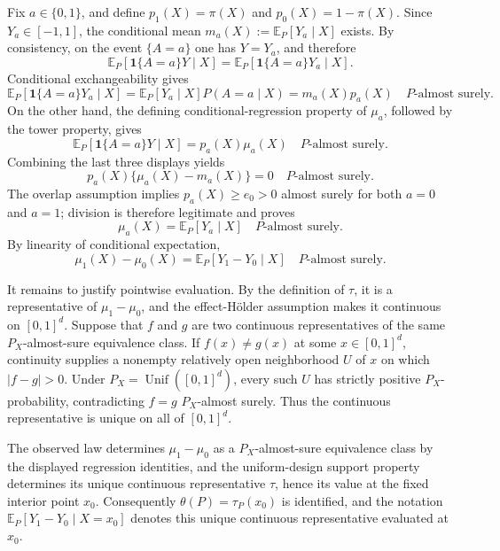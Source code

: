 Fix \(a\in\{0,1\}\), and define \(p_1(X)=\pi(X)\) and \(p_0(X)=1-\pi(X)\). Since \(Y_a\in[-1,1]\), the conditional mean \(m_a(X):=\mathbb E_P[Y_a\mid X]\) exists. By consistency, on the event \(\{A=a\}\) one has \(Y=Y_a\), and therefore
\[
 \mathbb E_P[\mathbf 1\{A=a\}Y\mid X]
 =\mathbb E_P[\mathbf 1\{A=a\}Y_a\mid X].
\]
Conditional exchangeability gives
\[
 \mathbb E_P[\mathbf 1\{A=a\}Y_a\mid X]
 =\mathbb E_P[Y_a\mid X]P(A=a\mid X)
 =m_a(X)p_a(X)
 \quad P\text{-almost surely}.
\]
On the other hand, the defining conditional-regression property of \(\mu_a\), followed by the tower property, gives
\[
 \mathbb E_P[\mathbf 1\{A=a\}Y\mid X]=p_a(X)\mu_a(X)
 \quad P\text{-almost surely}.
\]
Combining the last three displays yields
\[
 p_a(X)\{\mu_a(X)-m_a(X)\}=0
 \quad P\text{-almost surely}.
\]
The overlap assumption implies \(p_a(X)\ge e_0>0\) almost surely for both \(a=0\) and \(a=1\); division is therefore legitimate and proves
\[
 \mu_a(X)=\mathbb E_P[Y_a\mid X]
 \quad P\text{-almost surely}.
\]
By linearity of conditional expectation,
\[
 \mu_1(X)-\mu_0(X)
 =\mathbb E_P[Y_1-Y_0\mid X]
 \quad P\text{-almost surely}.
\]

It remains to justify pointwise evaluation. By the definition of \(\tau\), it is a representative of \(\mu_1-\mu_0\), and the effect-H\"older assumption makes it continuous on \([0,1]^d\). Suppose that \(f\) and \(g\) are two continuous representatives of the same \(P_X\)-almost-sure equivalence class. If \(f(x)\ne g(x)\) at some \(x\in[0,1]^d\), continuity supplies a nonempty relatively open neighborhood \(U\) of \(x\) on which \(|f-g|>0\). Under \(P_X=\operatorname{Unif}([0,1]^d)\), every such \(U\) has strictly positive \(P_X\)-probability, contradicting \(f=g\) \(P_X\)-almost surely. Thus the continuous representative is unique on all of \([0,1]^d\).

The observed law determines \(\mu_1-\mu_0\) as a \(P_X\)-almost-sure equivalence class by the displayed regression identities, and the uniform-design support property determines its unique continuous representative \(\tau\), hence its value at the fixed interior point \(x_0\). Consequently \(\theta(P)=\tau_P(x_0)\) is identified, and the notation \(\mathbb E_P[Y_1-Y_0\mid X=x_0]\) denotes this unique continuous representative evaluated at \(x_0\).
